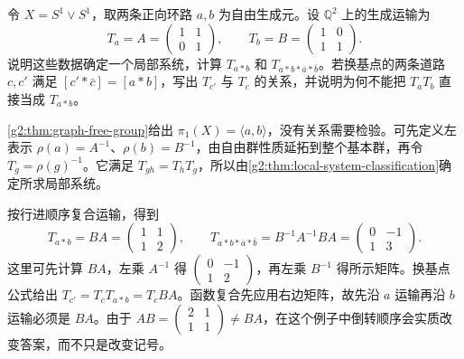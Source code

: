 \begin{exercise}\label{g2:ex:noncommuting-transport}
	令 \(X=S^1\vee S^1\)，取两条正向环路 \(a,b\) 为自由生成元。设 \(\mathbb Q^2\) 上的生成运输为
	\[
		T_a=A=\begin{pmatrix}1&1\\0&1\end{pmatrix},\qquad
		T_b=B=\begin{pmatrix}1&0\\1&1\end{pmatrix}.
	\]
	说明这些数据确定一个局部系统，计算 \(T_{a*b}\) 和 \(T_{a*b*\bar a*\bar b}\)。若换基点的两条道路 \(c,c'\) 满足 \([c'*\bar c]=[a*b]\)，写出 \(T_{c'}\) 与 \(T_c\) 的关系，并说明为何不能把 \(T_aT_b\) 直接当成 \(T_{a*b}\)。
\end{exercise}
\begin{solution}
	\cref{g2:thm:graph-free-group}给出 \(\pi_1(X)=\langle a,b\rangle\)，没有关系需要检验。可先定义左表示 \(\rho(a)=A^{-1}\)、\(\rho(b)=B^{-1}\)，由自由群性质延拓到整个基本群，再令 \(T_g=\rho(g)^{-1}\)。它满足 \(T_{gh}=T_hT_g\)，所以由\cref{g2:thm:local-system-classification}确定所求局部系统。

	按行进顺序复合运输，得到
	\[
		T_{a*b}=BA=\begin{pmatrix}1&1\\1&2\end{pmatrix},\qquad
		T_{a*b*\bar a*\bar b}=B^{-1}A^{-1}BA
		=\begin{pmatrix}0&-1\\1&3\end{pmatrix}.
	\]
	这里可先计算 \(BA\)，左乘 \(A^{-1}\) 得 \(\left(\begin{smallmatrix}0&-1\\1&2\end{smallmatrix}\right)\)，再左乘 \(B^{-1}\) 得所示矩阵。换基点公式给出 \(T_{c'}=T_cT_{a*b}=T_cBA\)。函数复合先应用右边矩阵，故先沿 \(a\) 运输再沿 \(b\) 运输必须是 \(BA\)。由于 \(AB=\left(\begin{smallmatrix}2&1\\1&1\end{smallmatrix}\right)\ne BA\)，在这个例子中倒转顺序会实质改变答案，而不只是改变记号。
\end{solution}

